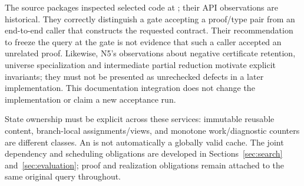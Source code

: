 The source packages inspected selected code at
; their API observations are
historical. They correctly distinguish a gate accepting a proof/type pair
from an end-to-end caller that constructs the requested contract. Their
recommendation to freeze the query at the gate is not evidence that such a
caller accepted an unrelated proof. Likewise, N5's observations about negative
certificate retention, universe specialization and intermediate partial
reduction motivate explicit invariants; they must not be presented as
unrechecked defects in a later implementation. This documentation integration
does not change the implementation or claim a new acceptance run.

State ownership must be explicit across these services: immutable reusable
content, branch-local assignments/views, and monotone work/diagnostic counters
are different classes. An  is not automatically a globally valid
cache. The joint dependency and scheduling obligations are developed in
Sections~\ref{sec:search} and~\ref{sec:evaluation}; proof and realization
obligations remain attached to the same original query throughout.
